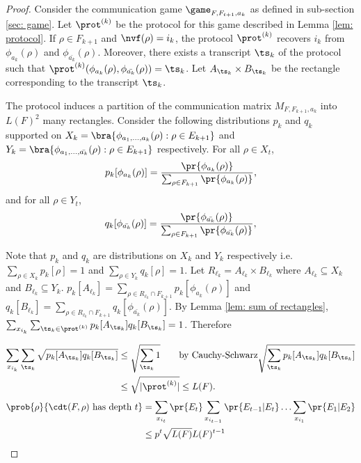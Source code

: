 \begin{proof}
Consider the communication game $\game_{F,F_{t+1},a_k}$ as defined in sub-section \ref{sec: game}.
Let $\prot^{(k)}$ be the protocol for this game described in Lemma \ref{lem: protocol}.
If $\rho \in F_{k+1}$ and $\nvf(\rho) = i_k$, the protocol $\prot^{(k)}$ recovers $i_k$ from $\phi_{a_k}(\rho)$ and $\phi_{\bar{a_k}}(\rho)$. 
Moreover, there exists a transcript $\ts_k$ of the protocol 
such that $\prot^{(k)}(\phi_{a_k}(\rho),\phi_{\bar{a_k}}(\rho)) = \ts_k $. Let $A_{\ts_k} \times B_{\ts_k}$
be the rectangle corresponding to the transcript $\ts_k$. 


The protocol induces a partition of the communication matrix $M_{F,F_{k+1},a_k}$ into $L(F)^2$ many rectangles.
    Consider the following distributions $p_k$ and $q_k$ supported on $X_k = \bra{\phi_{a_1,\ldots,a_k}(\rho):\rho \in E_{k+1}}$ and $Y_k= \bra{\phi_{a_1,\ldots,\bar{a_k}}(\rho): \rho \in E_{k+1}}$ respectively.
    For all $\rho \in X_t$, 
            $$p_k[\phi_{a_k}(\rho)] = \frac{
                                \pr{\phi_{a_k}(\rho)}
                            }
                            {
                            \sum_{\rho \in F_{k+1}}
                                \pr{\phi_{a_k}(\rho)}       
                            },$$
        and for all $\rho \in Y_t$, 
            $$q_k[\phi_{\bar{a_k}}(\rho)] = \frac{
                                \pr{\phi_{\bar{a_k}}(\rho)}
                            }
                            {
                            \sum_{\rho \in F_{k+1}}
                                \pr{\phi_{\bar{a_k}}(\rho)}               
                            },$$

        Note that $p_k$ and $q_k$ are distributions on $X_k$ and $Y_k$ respectively i.e. $\sum_{\rho \in X_k} p_k[\rho] = 1$ and $\sum_{\rho \in Y_k} q_k[\rho] = 1$.
    Let $R_{\ell_k} = A_{\ell_k} \times B_{\ell_k}$ where $A_{\ell_k} \subseteq X_k$ and $B_{\ell_k} \subseteq Y_k$. $p_k[A_{\ell_k}] = \sum_{\rho \in R_{\ell_k} \cap F_{k+1}} p_k[\phi_{a_k}(\rho)] $ and $q_k[B_{\ell_k}] = \sum_{\rho \in R_{\ell_k} \cap F_{k+1}} q_k[\phi_{\bar{a_k}}(\rho)]$. 
    By Lemma \ref{lem: sum of rectangles},
    $\sum_{x_{i_k}}\sum_{\ts_k \in \prot^{(k)}} p_k[A_{\ts_k}]q_k[B_{\ts_k}] = 1$. Therefore

\begin{align*}
    \sum_{x_{i_k}}\sum_{\ts_k} \sqrt{ p_{k}[A_{\ts_k}] q_k
    [B_{\ts_k}] }
        &\leq \sqrt{\sum_{\ts_k} 1} \tag*{by Cauchy-Schwarz} \sqrt{\sum_{\ts_k}p_k[A_{\ts_k}] q_k[B_{\ts_k}]}\\
        &\leq \sqrt{|\prot^{(k)}|} \leq L(F).
\end{align*}
    \begin{align*}
        \prob{\rho}{\cdt(F,\rho) \mathrm{\ has\ depth\ } t} 
            &= \sum_{x_{i_t}} \pr{E_t} \sum_{x_{i_{t-1}}} \pr{E_{t-1}|E_t}\ldots  \sum_{x_{i_1}} \pr{E_1|E_2}\\
            &\leq p^t \sqrt{L(F)} L(F)^{t-1}            
    \end{align*}
\end{proof}




